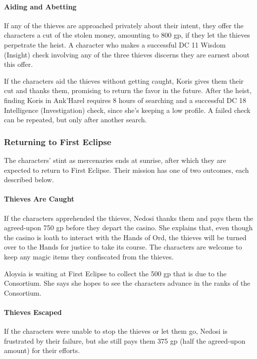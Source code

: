 \documentclass[10pt,a4paper,twoside,bg=print,twocolumn,openany,nodeprecatedcode]{dndbook}
\begin{document}
\paragraph{Aiding and Abetting}
If any of the thieves are approached privately about their intent, they offer the characters a cut of the stolen money, amounting to 800 gp, if they let the thieves perpetrate the heist. A character who makes a successful DC 11 Wisdom (Insight) check involving any of the three thieves discerns they are earnest about this offer.

If the characters aid the thieves without getting caught, Koris gives them their cut and thanks them, promising to return the favor in the future. After the heist, finding Koris in Ank'Harel requires 8 hours of searching and a successful DC 18 Intelligence (Investigation) check, since she's keeping a low profile. A failed check can be repeated, but only after another search.

\subsubsection{Returning to First Eclipse}
The characters' stint as mercenaries ends at sunrise, after which they are expected to return to First Eclipse. Their mission has one of two outcomes, each described below.

\paragraph{Thieves Are Caught}
If the characters apprehended the thieves, Nedosi thanks them and pays them the agreed-upon 750 gp before they depart the casino. She explains that, even though the casino is loath to interact with the Hands of Ord, the thieves will be turned over to the Hands for justice to take its course. The characters are welcome to keep any magic items they confiscated from the thieves.

Aloysia is waiting at First Eclipse to collect the 500 gp that is due to the Consortium. She says she hopes to see the characters advance in the ranks of the Consortium.

\paragraph{Thieves Escaped}
If the characters were unable to stop the thieves or let them go, Nedosi is frustrated by their failure, but she still pays them 375 gp (half the agreed-upon amount) for their efforts.
\end{document}
